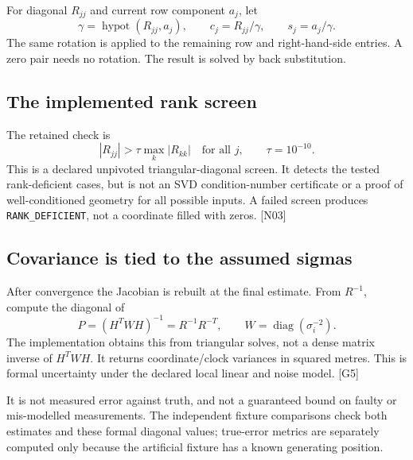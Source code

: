 \documentclass[11pt,a4paper]{article}
\newcommand{\code}[1]{\texttt{#1}}
\newcommand{\ext}[1]{\textcolor{muted}{[#1]}}
\newcommand{\dec}[1]{\textcolor{accent}{[N#1]}}
\begin{document}
For diagonal $R_{jj}$ and current row component $a_j$, let
\begin{equation}
\gamma=\operatorname{hypot}(R_{jj},a_j),\qquad c_j=R_{jj}/\gamma,
\qquad s_j=a_j/\gamma.
\end{equation}
The same rotation is applied to the remaining row and right-hand-side entries. A zero
pair needs no rotation. The result is solved by back substitution.

\subsection{The implemented rank screen}
The retained check is
\begin{equation}
|R_{jj}|>\tau\max_k|R_{kk}|\quad\text{for all }j,
\qquad\tau=10^{-10}.
\end{equation}
This is a declared unpivoted triangular-diagonal screen. It detects the tested
rank-deficient cases, but is not an SVD condition-number certificate or a proof of
well-conditioned geometry for all possible inputs. A failed screen produces
\code{RANK\_DEFICIENT}, not a coordinate filled with zeros. \dec{03}

\subsection{Covariance is tied to the assumed sigmas}
After convergence the Jacobian is rebuilt at the final estimate. From $R^{-1}$,
compute the diagonal of
\begin{equation}
P=(H^TWH)^{-1}=R^{-1}R^{-T},\qquad
W=\operatorname{diag}(\sigma_i^{-2}).
\end{equation}
The implementation obtains this from triangular solves, not a dense matrix inverse
of $H^TWH$. It returns coordinate/clock variances in squared metres. This is formal
uncertainty under the declared local linear and noise model. \ext{G5}

It is not measured error against truth, and not a guaranteed bound on faulty or
mis-modelled measurements. The independent fixture comparisons check both estimates
and these formal diagonal values; true-error metrics are separately computed only
because the artificial fixture has a known generating position.
\clearpage
\end{document}
